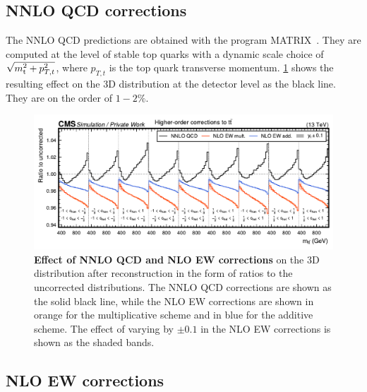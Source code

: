 \subsection{NNLO QCD corrections}

The NNLO QCD predictions are obtained with the program MATRIX~\cite{Grazzini:2017mhc}. They are computed at the level of stable top quarks with a dynamic scale choice of $\sqrt{\smash[b]{m_{\mathrm{t}}^2+p_{T,t}^2}}$, where $p_{T,t}$ is the top quark transverse momentum. \cref{fig:ah:ewqcdcorrs} shows the resulting effect on the 3D \mttchelchan distribution at the detector level as the black line. They are on the order of $1-2\%$.

\begin{figure}[t]
    \centering
    \includegraphics[width=0.99\linewidth]{figures/ah/ewqcdcorrs.pdf}
    \caption{\textbf{Effect of NNLO QCD and NLO EW corrections} on the 3D \mttchelchan distribution after reconstruction in the form of ratios to the uncorrected distributions. The NNLO QCD corrections are shown as the solid black line, while the NLO EW corrections are shown in orange for the multiplicative scheme and in blue for the additive scheme. The effect of varying \yt by $\pm 0.1$ in the NLO EW corrections is shown as the shaded bands.}
    \label{fig:ah:ewqcdcorrs}
\end{figure}

\subsection{NLO EW corrections}
\label{sec:ah:ewcorr}

